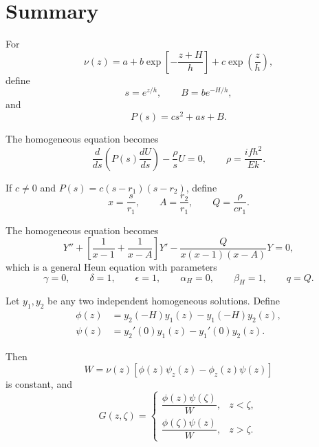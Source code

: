 \documentclass[10pt]{amsart}
\begin{document}
\section{Summary}

For
\begin{equation}
\nu(z)
=
a+b\exp\!\left[-\frac{z+H}{h}\right]
+
c\exp\!\left(\frac{z}{h}\right),
\end{equation}
define
\begin{equation}
s=e^{z/h},
\qquad
B=b e^{-H/h},
\end{equation}
and
\begin{equation}
P(s)=c s^2+a s+B.
\end{equation}

The homogeneous equation becomes
\begin{equation}
\frac{d}{ds}
\left(
P(s)\frac{dU}{ds}
\right)
-
\frac{\rho}{s}U=0,
\qquad
\rho=\frac{i f h^2}{E k}.
\end{equation}

If \(c\neq 0\) and \(P(s)=c(s-r_1)(s-r_2)\), define
\begin{equation}
x=\frac{s}{r_1},
\qquad
A=\frac{r_2}{r_1},
\qquad
Q=\frac{\rho}{c r_1}.
\end{equation}

The homogeneous equation becomes
\begin{equation}
Y''
+
\left[
\frac{1}{x-1}
+
\frac{1}{x-A}
\right]Y'
-
\frac{Q}{x(x-1)(x-A)}Y
=0,
\end{equation}
which is a general Heun equation with parameters
\begin{equation}
\gamma=0,
\qquad
\delta=1,
\qquad
\epsilon=1,
\qquad
\alpha_H=0,
\qquad
\beta_H=1,
\qquad
q=Q.
\end{equation}

Let \(y_1,y_2\) be any two independent homogeneous solutions. Define
\begin{align}
\phi(z)
&=
y_2(-H)y_1(z)-y_1(-H)y_2(z),
\\[0.5em]
\psi(z)
&=
y_2'(0)y_1(z)-y_1'(0)y_2(z).
\end{align}

Then
\begin{equation}
W
=
\nu(z)
\left[
\phi(z)\psi_z(z)-\phi_z(z)\psi(z)
\right]
\end{equation}
is constant, and
\begin{equation}
G(z,\zeta)
=
\begin{cases}
\dfrac{\phi(z)\psi(\zeta)}{W},
& z<\zeta,\\[1.2em]
\dfrac{\phi(\zeta)\psi(z)}{W},
& z>\zeta.
\end{cases}
\end{equation}
\end{document}
